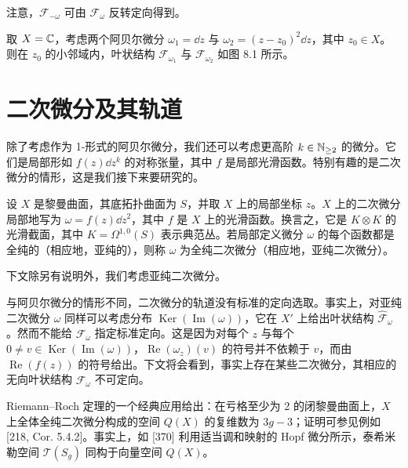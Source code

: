 注意，$\mathcal{F}_{-\omega}$ 可由 $\mathcal{F}_\omega$ 反转定向得到。

\begin{example}[8.3] 取 $X=\mathbb{C}$，考虑两个阿贝尔微分 $\omega_1=\dd z$ 与 $\omega_2=(z-z_0)^2\dd z$，其中 $z_0\in X$。则在 $z_0$ 的小邻域内，叶状结构 $\mathcal{F}_{\omega_1}$ 与 $\mathcal{F}_{\omega_2}$ 如图 8.1 所示。\end{example}


\section{二次微分及其轨道}

除了考虑作为 1-形式的阿贝尔微分，我们还可以考虑更高阶 $k\in\mathbb{N}_{\ge 2}$ 的微分。它们是局部形如 $f(z)\dd z^k$ 的对称张量，其中 $f$ 是局部光滑函数。特别有趣的是二次微分的情形，这是我们接下来要研究的。

\begin{definition}[8.4] 设 $X$ 是黎曼曲面，其底拓扑曲面为 $S$，并取 $X$ 上的局部坐标 $z$。$X$ 上的二次微分局部地写为 $\omega=f(z)\dd z^2$，其中 $f$ 是 $X$ 上的光滑函数。换言之，它是 $K\otimes K$ 的光滑截面，其中 $K=\Omega^{1,0}(S)$ 表示典范丛。若局部定义微分 $\omega$ 的每个函数都是全纯的（相应地，亚纯的），则称 $\omega$ 为全纯二次微分（相应地，亚纯二次微分）。\end{definition}

下文除另有说明外，我们考虑亚纯二次微分。

\begin{remark}[8.5] 与阿贝尔微分的情形不同，二次微分的轨道没有标准的定向选取。事实上，对亚纯二次微分 $\omega$ 同样可以考虑分布 $\operatorname{Ker}(\operatorname{Im}(\omega))$，它在 $X'$ 上给出叶状结构 $\hat{\mathcal{F}}_\omega$。然而不能给 $\hat{\mathcal{F}}_\omega$ 指定标准定向。这是因为对每个 $z$ 与每个 $0\ne v\in\operatorname{Ker}(\operatorname{Im}(\omega))$，$\operatorname{Re}(\omega_z)(v)$ 的符号并不依赖于 $v$，而由 $\operatorname{Re}(f(z))$ 的符号给出。下文将会看到，事实上存在某些二次微分，其相应的无向叶状结构 $\hat{\mathcal{F}}_\omega$ 不可定向。\end{remark}

Riemann–Roch 定理的一个经典应用给出：在亏格至少为 2 的闭黎曼曲面上，$X$ 上全体全纯二次微分构成的空间 $Q(X)$ 的复维数为 $3g-3$；证明可参见例如 [218, Cor. 5.4.2]。事实上，如 [370] 利用适当调和映射的 Hopf 微分所示，泰希米勒空间 $\mathcal{T}(S_g)$ 同构于向量空间 $Q(X)$。

